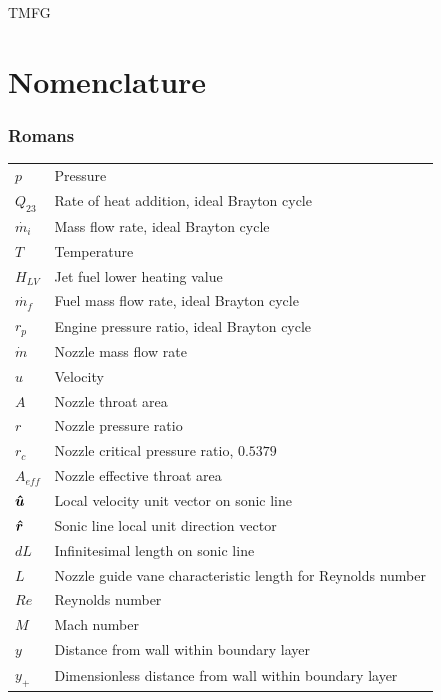 \documentclass[a4paper, 11pt, oneside]{report}
\begin{document}
TMFG \newline
\date{\mydate\today}



\tableofcontents
\listoffigures
\listoftables



\chapter*{Nomenclature}


\subsection*{Romans}
\begin{table}[H]
\begin{center}
\begin{tabular}{ll}
$p$ & Pressure \\
$Q_{23}$ & Rate of heat addition, ideal Brayton cycle \\
$\dot{m_i}$ & Mass flow rate, ideal Brayton cycle \\
$T$ & Temperature \\
$H_{LV}$ & Jet fuel lower heating value \\
$\dot{m_f}$ & Fuel mass flow rate, ideal Brayton cycle \\
$r_p$ & Engine pressure ratio, ideal Brayton cycle \\
$\dot{m}$ & Nozzle mass flow rate \\
$u$ & Velocity \\
$A$ & Nozzle throat area \\
$r$ & Nozzle pressure ratio \\
$r_c$ & Nozzle critical pressure ratio, $0.5379$ \\
$A_{eff}$ & Nozzle effective throat area \\
$\vu*{u}$ & Local velocity unit vector on sonic line \\
$\vu*{r}$ & Sonic line local unit direction vector \\
$dL$ & Infinitesimal length on sonic line \\
$L$ & Nozzle guide vane characteristic length for Reynolds number \\
$Re$ & Reynolds number \\
$M$ & Mach number \\
$y$ & Distance from wall within boundary layer \\
$y_+$ & Dimensionless distance from wall within boundary layer \\

\end{tabular}
\end{center}
\end{table}
\end{document}
